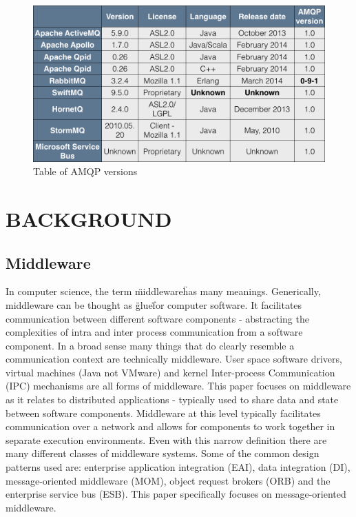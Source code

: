 \documentclass{thesis}
\begin{document}
\begin{figure}[h]
\centering
\includegraphics[scale=.40]{table_of_amqp_message_brokers}  
\caption{Table of AMQP versions }
\end{figure}

\chapter{BACKGROUND}

\section{Middleware}
In computer science, the term \"middleware\" has many meanings.  Generically, middleware can be thought as \"glue\"  for computer software.  It facilitates communication between different software components - abstracting the complexities of intra and inter process communication from a software component.  In a broad sense many things that do clearly resemble a communication context are technically middleware.  User space software drivers, virtual machines (Java not VMware) and kernel Inter-process Communication (IPC) mechanisms are all forms of middleware.  This paper focuses on middleware as it relates to distributed applications - typically used to share data and state between software components.  Middleware at this level typically facilitates communication over a network and allows for components to work together in separate execution environments.  Even with this narrow definition there are many different classes of middleware systems.  Some of the common design patterns used are: enterprise application integration (EAI), data integration (DI), message-oriented middleware (MOM), object request brokers (ORB) and the enterprise service bus (ESB).  This paper specifically focuses on message-oriented middleware. 
\end{document}

